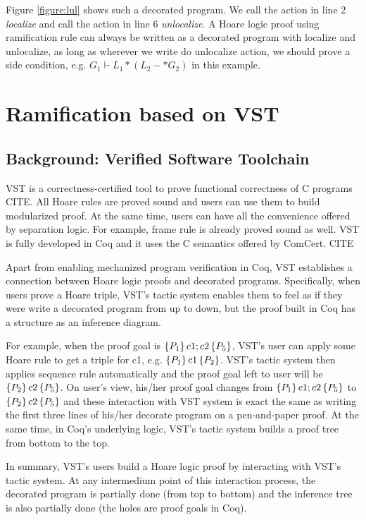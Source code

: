 Figure \ref{figure:lul} shows such a decorated program. We call the action in line 2 \emph{localize} and call the action in line 6 \emph{unlocalize}. A Hoare logic proof using ramification rule can always be written as a decorated program with localize and unlocalize, as long as wherever we write do unlocalize action, we should prove a side condition, e.g. $G_1 \vdash L_1 * (L_2 -* G_2)$ in this example.

\section{Ramification based on VST}\label{vst}

\subsection{Background: Verified Software Toolchain}
VST is a correctness-certified tool to prove functional correctness of C programs CITE. All Hoare rules are proved sound and users can use them to build modularized proof. At the same time, users can have all the convenience offered by separation logic. For example, frame rule is already proved sound as well. VST is fully developed in Coq and it uses the C semantics offered by ComCert. CITE

Apart from enabling mechanized program verification in Coq, VST establishes a connection between Hoare logic proofs and decorated programs. Specifically, when users prove a Hoare triple, VST's tactic system enables them to feel as if they were write a decorated program from up to down, but the proof built in Coq has a structure as an inference diagram.

For example, when the proof goal is $\{P_1\}\,c1;c2\,\{P_5\}$, VST's user can apply some Hoare rule to get a triple for c1, e.g. $\{P_1\}\,c1\,\{P_2\}$. VST's tactic system then applies sequence rule automatically and the proof goal left to user will be $\{P_2\}\,c2\,\{P_5\}$. On user's view, his/her proof goal changes from $\{P_1\}\,c1;c2\,\{P_5\}$ to $\{P_2\}\,c2\,\{P_5\}$ and these interaction with VST system is exact the same as writing the first three lines of his/her decorate program on a pen-and-paper proof. At the same time, in Coq's underlying logic, VST's tactic system builds a proof tree from bottom to the top.

In summary, VST's users build a Hoare logic proof by interacting with VST's tactic system. At any intermedium point of this interaction process, the decorated program is partially done (from top to bottom) and the inference tree is also partially done (the holes are proof goals in Coq).

